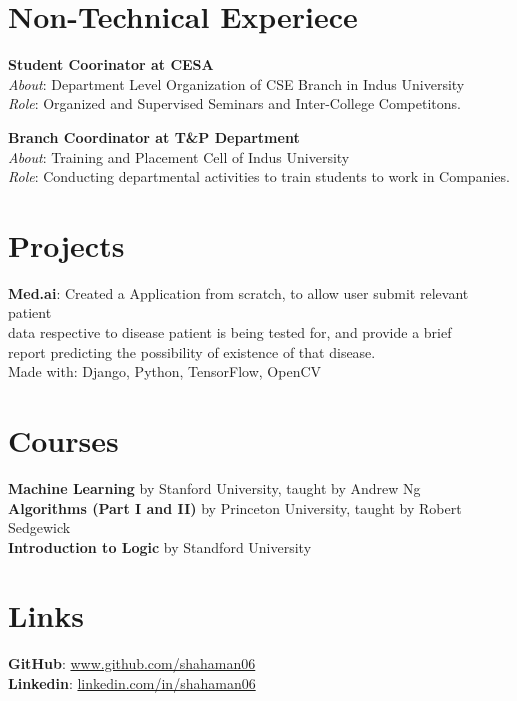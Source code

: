 \documentclass[margin, centered]{res}
\begin{document}
\begin{resume}
		\section{Non-Technical Experiece}
			\textbf{Student Coorinator at CESA}\\
			\textit{About}: Department Level Organization of CSE Branch in Indus University\\
			\textit{Role}: Organized and Supervised Seminars and Inter-College Competitons.
			\par
			\textbf{Branch Coordinator at T\&P Department}\\
			\textit{About}: Training and Placement Cell of Indus University\\
			\textit{Role}: Conducting departmental activities to train students to work in Companies.
		
		\section{Projects}
			\textbf{Med.ai}:
			Created a Application from scratch, to allow user submit relevant patient \\data respective to disease patient is being tested for, and provide a brief \\report predicting the possibility of existence of that disease.
			\\Made with: Django, Python, TensorFlow, OpenCV
		
		\section{Courses}
			\textbf{Machine Learning} by Stanford University, taught by Andrew Ng\\
			\textbf{Algorithms (Part I and II)} by Princeton University, taught by Robert Sedgewick\\
			\textbf{Introduction to Logic} by Standford University
		
		\section{Links}
			\textbf{GitHub}: \href{https://github.com/shahaman06}{www.github.com/shahaman06}
			\\
			\textbf{Linkedin}: \href{https://www.linkedin.com/in/shahaman06/}{linkedin.com/in/shahaman06}
	\end{resume}
	
\end{document}
